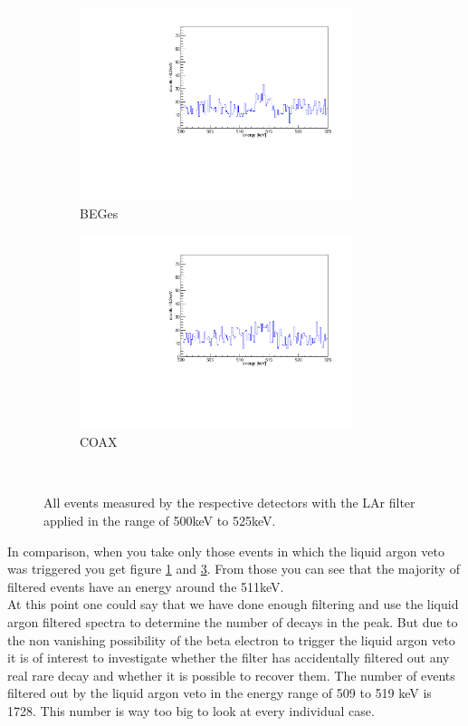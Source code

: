 \begin{figure}[t!]
\centering
\begin{subfigure}{.5\textwidth}
  \centering
	\includegraphics[width=80mm]{./Bilder/500525LArVetoBEGes.pdf}
    \caption{BEGes}
  \label{fig:LArBEGes}
\end{subfigure}%
\begin{subfigure}{.5\textwidth}
  \centering
	\includegraphics[width=80mm]{./Bilder/500525LArVetoCOAX.pdf}
  \caption{COAX}
  \label{fig:LArCOAX}
\end{subfigure}
    \\
	\vspace{0.5cm}
    \caption{All events measured by the respective detectors with the LAr filter applied in the range of 500keV to 525keV.}
\end{figure}

In comparison, when you take only those events in which the liquid argon veto was triggered you get figure \ref{fig:LArBEGes} and \ref{fig:LArCOAX}.
From those you can see that the majority of filtered events have an energy around the 511keV. 
\\

At this point one could say that we have done enough filtering and use the liquid argon filtered spectra to determine the number of decays in the peak.
But due to the non vanishing possibility of the beta electron to trigger the liquid argon veto it is of interest to investigate whether the filter has accidentally filtered out any real rare \Kr decay and whether it is possible to recover them.
The number of events filtered out by the liquid argon veto in the energy range of 509 to 519 keV is 1728.
This number is way too big to look at every individual case.
\\

